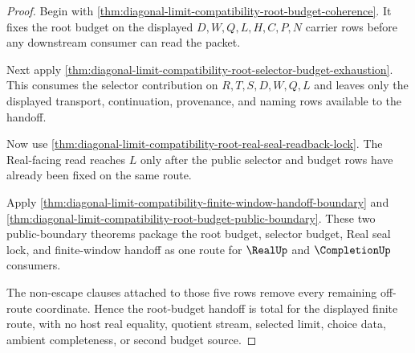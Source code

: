 \begin{proof}
Begin with
\autoref{thm:diagonal-limit-compatibility-root-budget-coherence}. It fixes the
root budget on the displayed $D,W,Q,L,H,C,P,N$ carrier rows before any
downstream consumer can read the packet.

Next apply
\autoref{thm:diagonal-limit-compatibility-root-selector-budget-exhaustion}.
This consumes the selector contribution on $R,T,S,D,W,Q,L$ and leaves only
the displayed transport, continuation, provenance, and naming rows available
to the handoff.

Now use
\autoref{thm:diagonal-limit-compatibility-root-real-seal-readback-lock}. The
Real-facing read reaches $L$ only after the public selector and budget rows
have already been fixed on the same route.

Apply
\autoref{thm:diagonal-limit-compatibility-finite-window-handoff-boundary} and
\autoref{thm:diagonal-limit-compatibility-root-budget-public-boundary}. These
two public-boundary theorems package the root budget, selector budget, Real
seal lock, and finite-window handoff as one route for $\RealUp$ and
$\CompletionUp$ consumers.

The non-escape clauses attached to those five rows remove every remaining
off-route coordinate. Hence the root-budget handoff is total for the displayed
finite route, with no host real equality, quotient stream, selected limit,
choice data, ambient completeness, or second budget source.
\end{proof}

